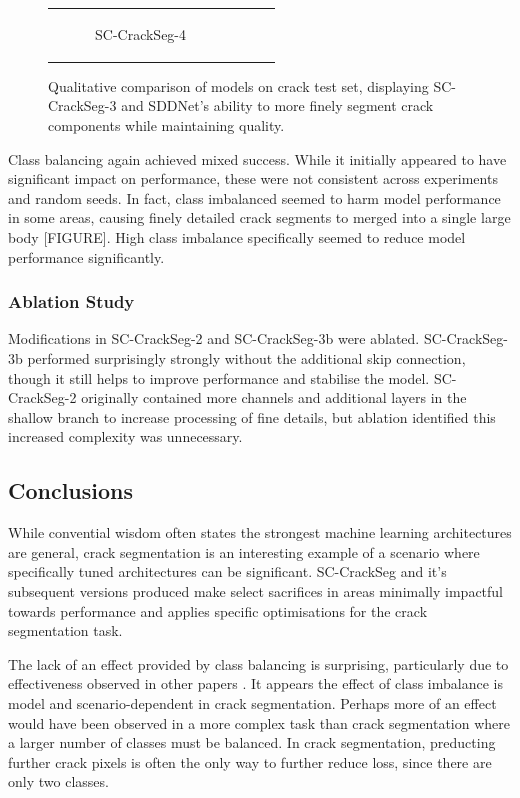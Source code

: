 \documentclass[a4paper,12pt]{report}
\begin{document}
\begin{figure}[htbp]
\begin{tabular}{cccc}
\begin{subfigure}[b]{0.23\textwidth}
            \caption{SC-CrackSeg-4}
            \label{fig:crackseg-experiment-qualitative-sc-crackseg-4}
        \end{subfigure}
    \end{tabular}
    \caption{Qualitative comparison of models on crack test set, displaying SC-CrackSeg-3 and SDDNet's ability to more finely segment crack components while maintaining quality.}
    \label{}
\end{figure}

Class balancing again achieved mixed success. While it initially appeared to have significant impact on performance, these were not consistent across experiments and random seeds. In fact, class imbalanced seemed to harm model performance in some areas, causing finely detailed crack segments to merged into a single large body [FIGURE]. High class imbalance specifically seemed to reduce model performance significantly.

\subsubsection*{Ablation Study}

Modifications in SC-CrackSeg-2 and SC-CrackSeg-3b were ablated. SC-CrackSeg-3b performed surprisingly strongly without the additional skip connection, though it still helps to improve performance and stabilise the model. SC-CrackSeg-2 originally contained more channels and additional layers in the shallow branch to increase processing of fine details, but ablation identified this increased complexity was unnecessary.



\subsection*{Conclusions}

While convential wisdom often states the strongest machine learning architectures are general, crack segmentation is an interesting example of a scenario where specifically tuned architectures can be significant. SC-CrackSeg and it's subsequent versions produced make select sacrifices in areas minimally impactful towards performance and applies specific optimisations for the crack segmentation task.

The lack of an effect provided by class balancing is surprising, particularly due to effectiveness observed in other papers \cite{liu_deepcrack_2019}. It appears the effect of class imbalance is model and scenario-dependent in crack segmentation. Perhaps more of an effect would have been observed in a more complex task than crack segmentation where a larger number of classes must be balanced. In crack segmentation, preducting further crack pixels is often the only way to further reduce loss, since there are only two classes.
\end{document}
